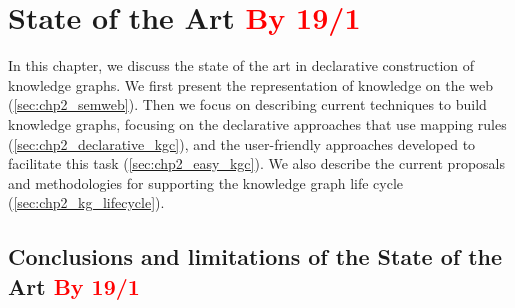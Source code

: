 \chapter{State of the Art \textcolor{red}{By 19/1}}
\label{chapter:sota}

In this chapter, we discuss the state of the art in declarative construction of knowledge graphs. We first present the representation of knowledge on the web (\cref{sec:chp2_semweb}). Then we focus on describing current techniques to build knowledge graphs, focusing on the declarative approaches that use mapping rules (\cref{sec:chp2_declarative_kgc}), and the user-friendly approaches developed to facilitate this task (\cref{sec:chp2_easy_kgc}). We also describe the current proposals and methodologies for supporting the knowledge graph life cycle (\cref{sec:chp2_kg_lifecycle}).











\section{Conclusions and limitations of the State of the Art \textcolor{red}{By 19/1}}